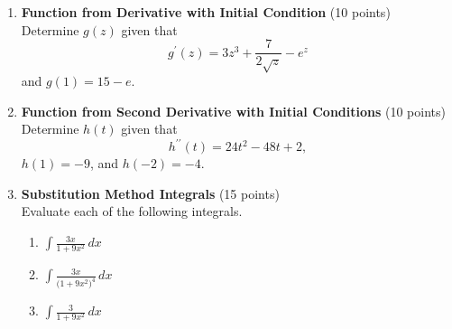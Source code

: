 \begin{enumerate}
  \item \textbf{Function from Derivative with Initial Condition} (10 points)\\
  Determine $g(z)$ given that
  \[
    g^{\prime}(z) = 3 z^3 + \frac{7}{2 \sqrt{z}} - e^z
  \]
  and $g(1) = 15 - e$.
  \begin{subanswer}
  \end{subanswer}

  \item \textbf{Function from Second Derivative with Initial Conditions} (10 points)\\
  Determine $h(t)$ given that
  \[
    h^{\prime \prime}(t) = 24 t^2 - 48 t + 2,
  \]
  $h(1) = -9$, and $h(-2) = -4$.
  \begin{subanswer}
  \end{subanswer}

  \item \textbf{Substitution Method Integrals} (15 points)\\
  Evaluate each of the following integrals.
  \begin{enumerate}[label=(\alph*)]
    \item $\displaystyle \int \frac{3 x}{1 + 9 x^2} \,dx$
    \item $\displaystyle \int \frac{3 x}{\bigl(1 + 9 x^2\bigr)^4} \,dx$
    \item $\displaystyle \int \frac{3}{1 + 9 x^2} \,dx$
  \end{enumerate}
  \begin{subanswer}
  \end{subanswer}

  \newpage


\end{enumerate}
